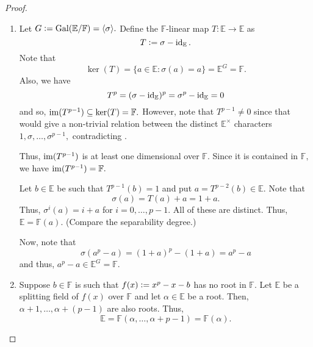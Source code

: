 \artinschreier*\label{thm:artinschreier2}
\begin{flushright}\hyperref[thm:artinschreier]{\upsym}\end{flushright}
\begin{proof}
    \phantom{hi}
    \begin{enumerate}[leftmargin=*]
        \item Let $G \vcentcolon= \operatorname{Gal}(\mathbb{E}/\mathbb{F}) = \langle \sigma\rangle.$ Define the $\mathbb{F}$-linear map $T : \mathbb{E} \to \mathbb{E}$ as 
        \begin{equation*} 
            T \vcentcolon= \sigma - \operatorname{id}_{\mathbb{E}}.
        \end{equation*}
        Note that
        \begin{equation*} 
            \ker(T) = \{a \in \mathbb{E} : \sigma(a) = a\} = \mathbb{E}^G = \mathbb{F}.
        \end{equation*}
        Also, we have
        \begin{equation*} 
            T^p = (\sigma - \operatorname{id}_{\mathbb{E}})^p = \sigma^p - \operatorname{id}_{\mathbb{E}} = 0
        \end{equation*}
        and so, $\operatorname{im}(T^{p - 1}) \subseteq \ker(T) = \mathbb{F}.$ However, note that $T^{p - 1} \neq 0$ since that would give a non-trivial relation between the distinct $\mathbb{E}^\times$ characters $1, \sigma, \ldots, \sigma^{p - 1},$ contradicting .

        Thus, $\operatorname{im}(T^{p - 1})$ is at least one dimensional over $\mathbb{F}.$ Since it is contained in $\mathbb{F},$ we have $\operatorname{im}(T^{p - 1}) = \mathbb{F}.$

        Let $b \in \mathbb{E}$ be such that $T^{p - 1}(b) = 1$ and put $a = T^{p - 2}(b) \in \mathbb{E}.$ Note that
        \begin{equation*} 
            \sigma(a) = T(a) + a = 1 + a.
        \end{equation*}
        Thus, $\sigma^i(a) = i + a$ for $i = 0, \ldots, p - 1.$ All of these are distinct. Thus, $\mathbb{E} = \mathbb{F}(a).$ (Compare the separability degree.)

        Now, note that
        \begin{equation*} 
            \sigma(a^p - a) = (1 + a)^p - (1 + a) = a^p - a
        \end{equation*}
        and thus, $a^p - a \in \mathbb{E}^G = \mathbb{F}.$
        \item Suppose $b \in \mathbb{F}$ is such that $f(x) \vcentcolon= x^p - x - b$ has no root in $\mathbb{F}.$ Let $\mathbb{E}$ be a splitting field of $f(x)$ over $\mathbb{F}$ and let $\alpha \in \mathbb{E}$ be a root. Then, $\alpha + 1, \ldots, \alpha + (p - 1)$ are also roots. Thus,
        \begin{equation*} 
            \mathbb{E} = \mathbb{F}(\alpha, \ldots, \alpha + p - 1) = \mathbb{F}(\alpha).
        \end{equation*}


\end{enumerate}
\end{proof}
